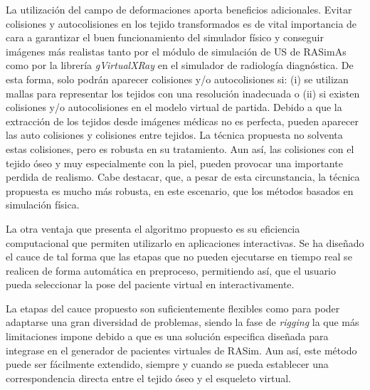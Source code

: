 La utilización del campo de deformaciones aporta beneficios adicionales. Evitar colisiones y autocolisiones en los tejido transformados es de vital importancia de cara a garantizar el buen funcionamiento del simulador físico y conseguir imágenes más realistas tanto por el módulo de simulación de \ac{US} de \ac{RASimAs} como por la librería \emph{gVirtualXRay} en el simulador de radiología diagnóstica. De esta forma, solo podrán aparecer colisiones y/o autocolisiones si: (i) se utilizan mallas para representar los tejidos con una resolución inadecuada o (ii) si existen colisiones y/o autocolisiones en el modelo virtual de partida. Debido a que la extracción de los tejidos desde imágenes médicas no es perfecta, pueden aparecer las auto colisiones y colisiones entre tejidos. La técnica propuesta no solventa estas colisiones, pero es robusta en su tratamiento. Aun así, las colisiones con el tejido óseo y muy especialmente con la piel, pueden provocar una importante perdida de realismo. Cabe destacar, que, a pesar de esta circunstancia, la técnica propuesta es mucho más robusta, en este escenario, que los métodos basados en simulación física. %





La otra ventaja que presenta el algoritmo propuesto es su eficiencia computacional que permiten utilizarlo en aplicaciones interactivas. Se ha diseñado el cauce de tal forma que las etapas que no pueden ejecutarse en tiempo real se realicen de forma automática en preproceso, permitiendo así, que el usuario pueda seleccionar la pose del paciente virtual en interactivamente.

La etapas del cauce propuesto son suficientemente flexibles como para poder adaptarse una gran diversidad de problemas, siendo la fase de \emph{rigging} la que más limitaciones impone debido a que es una solución especifica diseñada para integrase en el generador de pacientes virtuales de \ac{RASim}. Aun así, este método puede ser fácilmente extendido, siempre y cuando se pueda establecer una correspondencia directa entre el tejido óseo y el esqueleto virtual.

